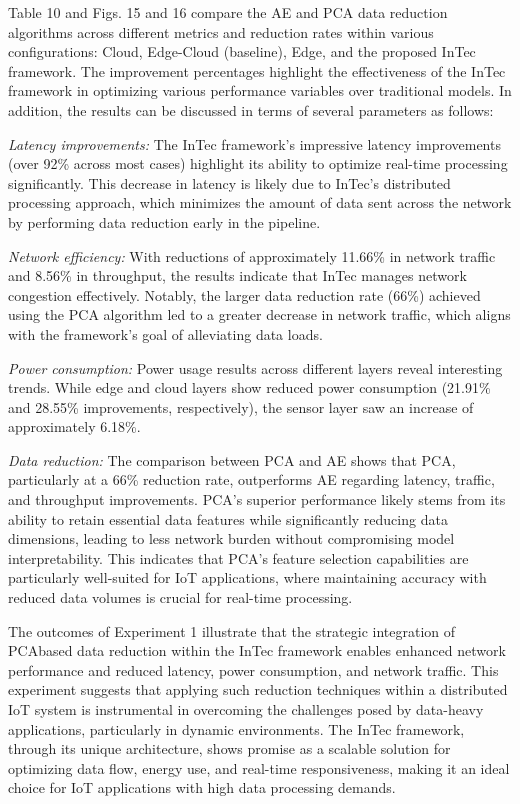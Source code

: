 \documentclass[11pt]{article}
\begin{document}
	Table 10 and Figs. 15 and 16 compare the AE and PCA data reduction algorithms across different metrics and reduction rates within various configurations:
	Cloud, Edge-Cloud (baseline), Edge, and the proposed InTec framework. The
	improvement percentages highlight the effectiveness of the InTec framework in
	optimizing various performance variables over traditional models. In addition,
	the results can be discussed in terms of several parameters as follows:
	
	\textit{Latency improvements:} The InTec framework’s impressive latency improvements (over 92\% across most cases) highlight its ability to optimize real-time
	processing significantly. This decrease in latency is likely due to InTec’s distributed processing approach, which minimizes the amount of data sent across the
	network by performing data reduction early in the pipeline.
	
	\textit{Network efficiency:} With reductions of approximately 11.66\% in network traffic
	and 8.56\% in throughput, the results indicate that InTec manages network congestion
	effectively. Notably, the larger data reduction rate (66\%) achieved using the PCA
	algorithm led to a greater decrease in network traffic, which aligns with the framework’s goal of alleviating data loads.
	
	\textit{Power consumption:} Power usage results across different layers reveal interesting trends. While edge and cloud layers show reduced power consumption
	(21.91\% and 28.55\% improvements, respectively), the sensor layer saw an increase of approximately 6.18\%.
	
	\textit{Data reduction:} The comparison between PCA and AE shows that PCA, particularly at a 66\% reduction rate, outperforms AE regarding latency, traffic, and throughput improvements. PCA’s superior performance likely stems from its ability to retain
	essential data features while significantly reducing data dimensions, leading to less
	network burden without compromising model interpretability. This indicates that
	PCA’s feature selection capabilities are particularly well-suited for IoT applications,
	where maintaining accuracy with reduced data volumes is crucial for real-time processing.
	
	The outcomes of Experiment 1 illustrate that the strategic integration of PCAbased data reduction within the InTec framework enables enhanced network performance and reduced latency, power consumption, and network traffic. This experiment suggests that applying such reduction techniques within a distributed IoT
	system is instrumental in overcoming the challenges posed by data-heavy applications, particularly in dynamic environments. The InTec framework, through its
	unique architecture, shows promise as a scalable solution for optimizing data flow,
	energy use, and real-time responsiveness, making it an ideal choice for IoT applications with high data processing demands.
	
\end{document}
